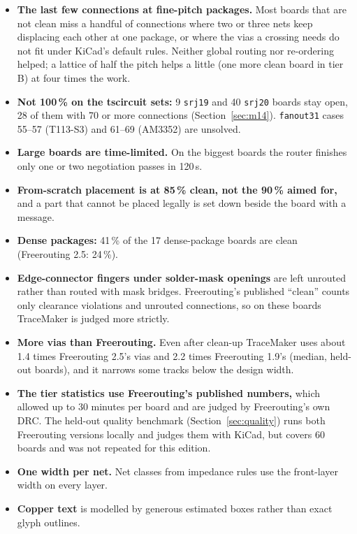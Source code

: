 \documentclass[10pt,a4paper]{article}
\begin{document}
\begin{itemize}[leftmargin=*]
  \item \textbf{The last few connections at fine-pitch packages.} Most boards that are not clean miss a handful of
  connections where two or three nets keep displacing each other at one package, or where the vias a crossing needs
  do not fit under KiCad's default rules. Neither global routing nor re-ordering helped; a lattice of half the
  pitch helps a little (one more clean board in tier B) at four times the work.
  \item \textbf{Not 100\,\% on the tscircuit sets:} 9 \texttt{srj19} and 40 \texttt{srj20} boards stay open, 28 of them with 70 or more
  connections (Section~\ref{sec:m14}). \texttt{fanout31} cases 55--57 (T113-S3) and 61--69 (AM3352) are unsolved.
  \item \textbf{Large boards are time-limited.} On the biggest boards the router finishes only one or two negotiation
  passes in 120\,s.
  \item \textbf{From-scratch placement is at 85\,\% clean, not the 90\,\% aimed for,} and a part that cannot be placed
  legally is set down beside the board with a message.
  \item \textbf{Dense packages:} 41\,\% of the 17 dense-package boards are clean (Freerouting 2.5: 24\,\%).
  \item \textbf{Edge-connector fingers under solder-mask openings} are left unrouted rather than routed with
  mask bridges. Freerouting's published ``clean'' counts only clearance violations and unrouted connections, so on
  these boards TraceMaker is judged more strictly.
  \item \textbf{More vias than Freerouting.} Even after clean-up TraceMaker uses about 1.4 times Freerouting 2.5's vias
  and 2.2 times Freerouting 1.9's (median, held-out boards), and it narrows some tracks below the design width.
  \item \textbf{The tier statistics use Freerouting's published numbers,} which allowed up to 30 minutes per board and
  are judged by Freerouting's own DRC. The held-out quality benchmark (Section~\ref{sec:quality}) runs both
  Freerouting versions locally and judges them with KiCad, but covers 60 boards and was not repeated for this
  edition.
  \item \textbf{One width per net.} Net classes from impedance rules use the front-layer width on every layer.
  \item \textbf{Copper text} is modelled by generous estimated boxes rather than exact glyph outlines.

\end{itemize}
\end{document}
